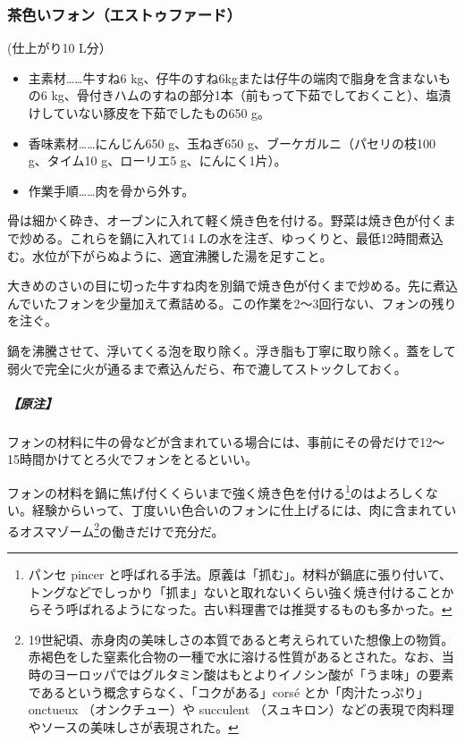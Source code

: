\begin{recette}
\hypertarget{fonds-brun}{%
\subsubsection{茶色いフォン（エストゥファード）}\label{fonds-brun}}



(仕上がり10 L分）

\begin{itemize}
\item
  主素材\ldots{}\ldots{}牛すね6
  kg、仔牛のすね6kgまたは仔牛の端肉で脂身を含まないもの6
  kg、骨付きハムのすねの部分1本（前もって下茹でしておくこと）、塩漬けしていない豚皮を下茹でしたもの650
  g。
\item
  香味素材\ldots{}\ldots{}にんじん650 g、玉ねぎ650
  g、ブーケガルニ（パセリの枝100 g、タイム10 g、ローリエ5
  g、にんにく1片）。
\item
  作業手順\ldots{}\ldots{}肉を骨から外す。
\end{itemize}

骨は細かく砕き、オーブンに入れて軽く焼き色を付ける。野菜は焼き色が付くまで炒める。これらを鍋に入れて14
Lの水を注ぎ、ゆっくりと、最低12時間煮込む。水位が下がらぬように、適宜沸騰した湯を足すこと。

大きめのさいの目に切った牛すね肉を別鍋で焼き色が付くまで炒める。先に煮込んでいたフォンを少量加えて煮詰める。この作業を2〜3回行ない、フォンの残りを注ぐ。

鍋を沸騰させて、浮いてくる泡を取り除く。浮き脂も丁寧に取り除く。蓋をして弱火で完全に火が通るまで煮込んだら、布で漉してストックしておく。

\hypertarget{nota-fonds-brun}{%
\subparagraph{【原注】}\label{nota-fonds-brun}}

フォンの材料に牛の骨などが含まれている場合には、事前にその骨だけで12〜
15時間かけてとろ火でフォンをとるといい。

フォンの材料を鍋に焦げ付くくらいまで強く焼き色を付ける\footnote{パンセ
  pincer
  と呼ばれる手法。原義は「抓む」。材料が鍋底に張り付いて、トングなどでしっかり「抓ま」ないと取れないくらい強く焼き付けることからそう呼ばれるようになった。古い料理書では推奨するものも多かった。}のはよろしくない。経験からいって、丁度いい色合いのフォンに仕上げるには、肉に含まれているオスマゾーム\footnote{19世紀頃、赤身肉の美味しさの本質であると考えられていた想像上の物質。赤褐色をした窒素化合物の一種で水に溶ける性質があるとされた。なお、当時のヨーロッパではグルタミン酸はもとよりイノシン酸が「うま味」の要素であるという概念すらなく、「コクがある」corsé
  とか「肉汁たっぷり」onctueux （オンクチュー）や succulent
  （スュキロン）などの表現で肉料理やソースの美味しさが表現された。}の働きだけで充分だ。


\end{recette}
